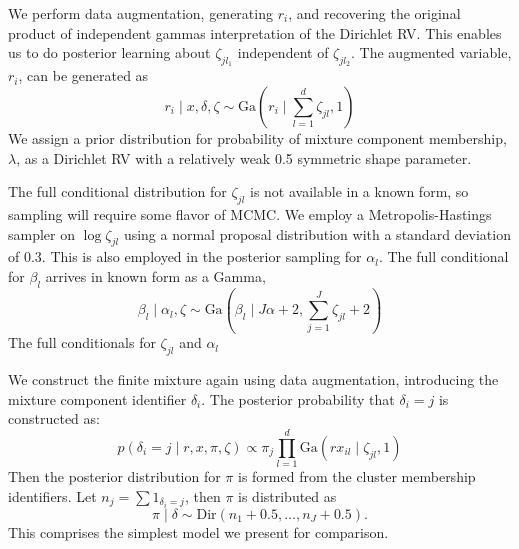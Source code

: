 We perform data augmentation, generating $r_i$, and recovering the original product of independent
  gammas interpretation of the Dirichlet RV.  This enables us to do posterior learning about
  $\zeta_{jl_1}$ independent of $\zeta_{jl_2}$.  The augmented variable, $r_i$, can be generated as
  \begin{equation}
    \label{eq:L1augmentation}
    r_i\mid x, \delta, \zeta \sim \text{Ga}(r_i \mid \sum_{l = 1}^d \zeta_{jl}, 1)
  \end{equation}
  We assign a prior distribution for probability of mixture component membership, $\lambda$, as a
  Dirichlet RV with a relatively weak 0.5 symmetric shape parameter.

The full conditional distribution for $\zeta_{jl}$ is not available in a known form, so sampling
  will require some flavor of MCMC.  We employ a Metropolis-Hastings sampler on $\log\zeta_{jl}$
  using a normal proposal distribution with a standard deviation of 0.3.  This is also employed in
  the posterior sampling for $\alpha_l$. The full conditional for $\beta_l$ arrives in known form
  as a Gamma,
  \begin{equation}
    \label{eq:betafc}
    \beta_l\mid \alpha_l, \zeta \sim \text{Ga}(\beta_l \mid J\alpha + 2, \sum_{j = 1}^J\zeta_{jl} + 2)
  \end{equation}
  The full conditionals for $\zeta_{jl}$ and $\alpha_l$ 

We construct the finite mixture again using data augmentation, introducing the mixture component
  identifier $\delta_i$. The posterior probability that $\delta_i = j$ is constructed as:
  \begin{equation}
    \label{eq:finitemix}
    p(\delta_i = j \mid r, x, \pi, \zeta) \propto \pi_j\prod_{l = 1}^d\text{Ga}(rx_{il}\mid\zeta_{jl},1)
  \end{equation}
  Then the posterior distribution for $\pi$ is formed from the cluster membership identifiers.  Let
  $n_j = \sum 1_{\delta_i = j}$, then $\pi$ is distributed as
  \begin{equation}
    \pi \mid \delta \sim \text{Dir}(n_1 + 0.5, \ldots, n_J + 0.5).
  \end{equation}
  This comprises the simplest model we present for comparison.

